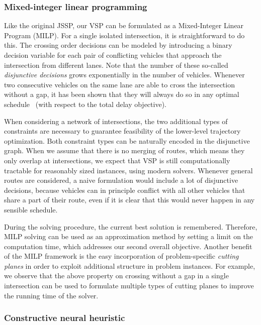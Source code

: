 \documentclass{article}
\theoremstyle{definition}
\theoremstyle{plain}
\begin{document}
\subsubsection{Mixed-integer linear programming}

Like the original JSSP, our VSP can be formulated as a Mixed-Integer Linear
Program (MILP).
For a single isolated intersection, it is straightforward to do this. The
crossing order decisions can be modeled by introducing a binary decision
variable for each pair of conflicting vehicles that approach the intersection
from different lanes. Note that the number of these so-called
\textit{disjunctive decisions} grows exponentially in the number of vehicles.
Whenever two consecutive vehicles on the same lane are able to cross the
intersection without a gap, it has been shown that they will always do so in any
optimal schedule~\cite{limpensOnlinePlatoonForming2023} (with respect to the
total delay objective).

When considering a network of intersections, the two additional types of constraints
are necessary to guarantee feasibility of the lower-level trajectory
optimization.
Both constraint types can be naturally encoded in the disjunctive graph.
%
When we assume that there is no merging of routes, which means they only overlap
at intersections, we expect that VSP is still computationally tractable for
reasonably sized instances, using modern solvers. Whenever general routes
are considered, a naive formulation would include a lot of disjunctive
decisions, because vehicles can in principle conflict with all other vehicles
that share a part of their route, even if it is clear that this would never
happen in any sensible schedule.

During the solving procedure, the current best solution is remembered.
Therefore, MILP solving can be used as an approximation method by setting a
limit on the computation time, which addresses our second overall objective.
%
Another benefit of the MILP framework is the easy incorporation of
problem-specific \textit{cutting planes} in order to exploit additional
structure in problem instances. For example, we observe that the above property
on crossing without a gap in a single intersection can be used to formulate
multiple types of cutting planes to improve the running time of the solver.


\subsubsection{Constructive neural heuristic}
\label{sec:constructive_neural}
\end{document}
